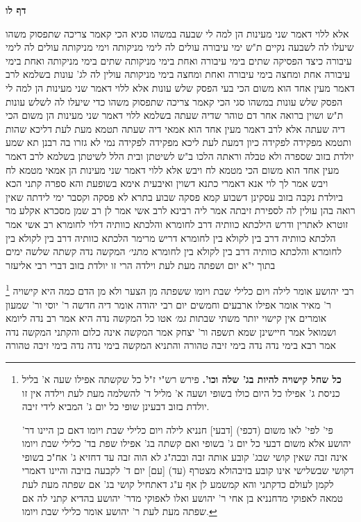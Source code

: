 \documentclass[12pt, openany]{book}
\newcommand{\sethebfont}{
\fontsize{10.5pt}{21.0pt} \selectfont
}
\newcommand{\twocol}[1]{
	{\sethebfont \begin{multicols}{2}
			#1
	\end{multicols}}	
}
\newcommand{\sectname}{}
\newcommand{\newsection}[1]{
	\addcontentsline{toc}{section}{#1}
	\renewcommand{\sectname}{#1}	
	\vspace{-\baselineskip}
	\begin{center}
		\textbf{%
\fontsize{16pt}{16pt}\selectfont
			#1}
	\end{center}
	\vspace{-\baselineskip}
	\nopagebreak
}
\newcommand{\footnotecomment}[1]{
	\renewcommand\thefootnote{}
	\footnote{#1}}
\newcommand{\commenta}[1]{\footnotecomment{#1}}
\begin{document}
\newsection{דף לו}
\twocol{אלא ללוי דאמר שני מעינות הן למה לי שבעה במשהו סגיא 
הכי קאמר צריכה שתפסוק משהו שיעלו לה לשבעה נקיים 
ת"ש ימי עיבורה עולים לה לימי מניקותה וימי מניקותה עולים לה לימי עיבורה 
כיצד הפסיקה שתים בימי עיבורה ואחת בימי מניקותה שתים בימי מניקותה ואחת בימי עיבורה אחת ומחצה בימי עיבורה ואחת ומחצה בימי מניקותה עולין לה לג' עונות 
בשלמא לרב דאמר מעין אחד הוא משום הכי בעי הפסק שלש עונות אלא ללוי דאמר שני מעינות הן למה לי הפסק שלש עונות במשהו סגי 
הכי קאמר צריכה שתפסוק משהו כדי שיעלו לה לשלש עונות 
ת"ש ושוין ברואה אחר דם טוהר שדיה שעתה 
בשלמא ללוי דאמר שני מעינות הן משום הכי דיה שעתה אלא לרב דאמר מעין אחד הוא אמאי דיה שעתה תטמא מעת לעת 
דליכא שהות 
ותטמא מפקידה לפקידה כיון דמעת לעת ליכא מפקידה לפקידה נמי לא גזרו בה רבנן 
תא שמע יולדת בזוב שספרה ולא טבלה וראתה הלכו ב"ש לשיטתן ובית הלל לשיטתן 
בשלמא לרב דאמר מעין אחד הוא משום הכי מטמא לח ויבש אלא ללוי דאמר שני מעינות הן אמאי מטמא לח ויבש 
אמר לך לוי אנא דאמרי כתנא דשוין 
ואיבעית אימא בשופעת והא ספרה קתני 
הכא ביולדת נקבה בזוב עסקינן דשבוע קמא פסקה שבוע בתרא לא פסקה וקסבר ימי לידתה שאין רואה בהן עולין לה לספירת זיבתה 
אמר ליה רבינא לרב אשי אמר לן רב שמן מסכרא אקלע מר זוטרא לאתרין ודרש הילכתא כוותיה דרב לחומרא והלכתא כוותיה דלוי לחומרא 
רב אשי אמר הלכתא כוותיה דרב בין לקולא בין לחומרא דריש מרימר הלכתא כוותיה דרב בין לקולא בין לחומרא והלכתא כוותיה דרב בין לקולא בין לחומרא
{\large\emph{מתני׳}} המקשה נדה קשתה שלשה ימים בתוך י"א יום ושפתה מעת לעת וילדה הרי זו יולדת בזוב דברי רבי אליעזר 
\commenta{\textbf{כל שחל קישויה להיות בג' שלה וכו'.} פירש רש"י ז"ל כל שקשתה אפילו שעה א' בליל כניסת ג' אפילו כל היום כולו בשופי ושעה א' מליל ד' להשלמה מעת לעת וילדה אין זו יולדת בזוב דבעינן שופי כל יום ג' המביא לידי זיבה.\par פי' לפי' לאו משום (דכפי) [דבעי] חנניא לילה ויום כלילי שבת ויומו דאם כן היינו דר' יהושע אלא משום דבעי כל יום ג' בשופי ואם קשתה בג' אפילו שפת בד' כלילי שבת ויומו אינה זבה שאין קושי שבג' קובע אותה זבה ובכה"ג לא הוה זבה עד דחזיא ג' אח"כ בשופי דקושי שבשלישי אינו קובע בזיבהולא מצטרף (עד) [עם] יום ד' לקבעה בזיבה והיינו דאמרי לקמן לעולם כדקתני והא קמשמע לן אף ע"ג דאתחיל קושי בג' אם שפתה מעת לעת טמאה לאפוקי מדחנניא בן אחי ר' יהושע ואלו לאפוקי מדר' יהושע בהדיא קתני לה אם שפתה מעת לעת ר' יהושע אומר כלילי שבת ויומו. }
רבי יהושע אומר לילה ויום כלילי שבת ויומו ששפתה מן הצער ולא מן הדם 
כמה היא קישויה ר' מאיר אומר אפילו ארבעים וחמשים יום רבי יהודה אומר דיה חדשה ר' יוסי ור' שמעון אומרים אין קישוי יותר משתי שבתות
{\large\emph{גמ׳}} אטו כל המקשה נדה היא
אמר רב נדה ליומא ושמואל אמר חיישינן שמא תשפה 
ור' יצחק אמר המקשה אינה כלום והקתני המקשה נדה 
אמר רבא בימי נדה נדה בימי זיבה טהורה והתניא המקשה בימי נדה נדה בימי זיבה טהורה 
}
\end{document}
